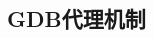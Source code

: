 \documentclass[class=book, crop=false]{standalone}
\begin{document}
\begin{CJK}{UTF8}{gbsn}

\chapter{GDB代理机制}













\cleardoublepage

\end{CJK}
\end{document}
